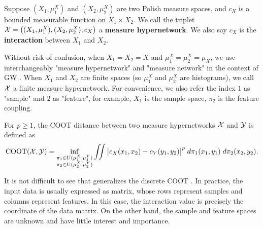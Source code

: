 \begin{definition}
Suppose $(X_1, \mu_1^X)$ and $(X_2, \mu_2^X)$ are two Polish measure spaces,
and $c_X$ is a bounded measurable function on $X_1 \times X_2$.
We call the triplet $\mathcal X = \big((X_1, \mu_1^X), (X_2, \mu_2^X), c_X \big)$
a \textbf{measure hypernetwork}. We also say $c_X$ is the \textbf{interaction}
between $X_1$ and $X_2$.
\end{definition}
Without risk of confusion, when $X_1 = X_2 = X$ and $\mu_1^X = \mu_2^X = \mu_X$,
we use interchangeably "measure hypernetwork" and "measure network"
in the context of GW \citep{Chowdhury19}.
When $X_1$ and $X_2$ are finite spaces (so $\mu_1^X$ and $\mu_2^X$ are histograms),
we call $\mathcal X$ a finite measure hypernetwork. For convenience, we also refer the index $1$ as "sample"
and $2$ as "feature", for example, $X_1$ is the sample space, $\pi_2$ is the feature coupling.
\begin{definition}
  \label{def:cont_coot}
  For $p \geq 1$, the COOT distance between two measure hypernetworks $\mathcal X$ and $\mathcal Y$ is defined as
  \begin{align} \label{eq:cont_coot}
    \text{COOT}(\mathcal X, \mathcal Y) =
    \inf_{\substack{\pi_1 \in U(\mu^X_1, \mu^Y_1) \\
    \pi_2 \in U(\mu^X_2, \mu^Y_2)}} \iint
    \big\vert c_X(x_1, x_2) - c_Y(y_1, y_2) \big\vert^p \; d\pi_1(x_1, y_1) \; d\pi_2(x_2, y_2).
  \end{align}
\end{definition}
It is not difficult to see that  generalizes the discrete COOT \citep{Redko20}.
In practice, the input data is usually expressed as matrix,
whose rows represent samples and columns represent features.
In this case, the interaction value is precisely the coordinate of the data matrix.
On the other hand, the sample and feature spaces are unknown and have little interest and importance.

